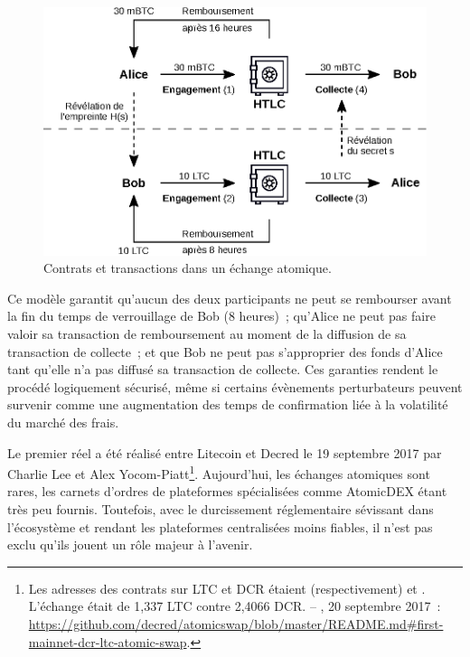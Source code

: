 \begin{figure}[ht]
  \centering
  \includegraphics[scale=0.9]{img/atomic-swap-contract.eps}
  \caption{Contrats et transactions dans un échange atomique.}
  \label{fig:atomic-swap-contract}
\end{figure}

Ce modèle garantit qu'aucun des deux participants ne peut se rembourser avant la fin du temps de verrouillage de Bob (8 heures)~; qu'Alice ne peut pas faire valoir sa transaction de remboursement au moment de la diffusion de sa transaction de collecte~; et que Bob ne peut pas s'approprier des fonds d'Alice tant qu'elle n'a pas diffusé sa transaction de collecte. Ces garanties rendent le procédé logiquement sécurisé, même si certains évènements perturbateurs peuvent survenir comme une augmentation des temps de confirmation liée à la volatilité du marché des frais.

Le premier  réel a été réalisé entre Litecoin et Decred le 19 septembre 2017 par Charlie Lee et Alex Yocom-Piatt\footnote{Les adresses des contrats sur LTC et DCR étaient (respectivement)  et . L'échange était de 1,337 LTC contre 2,4066 DCR. -- , 20 septembre 2017~: \url{https://github.com/decred/atomicswap/blob/master/README.md\#first-mainnet-dcr-ltc-atomic-swap}.}. Aujourd'hui, les échanges atomiques sont rares, les carnets d'ordres de plateformes spécialisées comme AtomicDEX étant très peu fournis. Toutefois, avec le durcissement réglementaire sévissant dans l'écosystème et rendant les plateformes centralisées moins fiables, il n'est pas exclu qu'ils jouent un rôle majeur à l'avenir.

